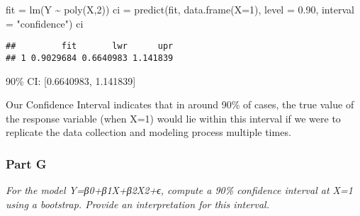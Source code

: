 \documentclass[
]{article}
\newenvironment{Shaded}{\begin{snugshade}}{\end{snugshade}}
\newcommand{\AttributeTok}[1]{\textcolor[rgb]{0.77,0.63,0.00}{#1}}
\newcommand{\DecValTok}[1]{\textcolor[rgb]{0.00,0.00,0.81}{#1}}
\newcommand{\FloatTok}[1]{\textcolor[rgb]{0.00,0.00,0.81}{#1}}
\newcommand{\FunctionTok}[1]{\textcolor[rgb]{0.00,0.00,0.00}{#1}}
\newcommand{\NormalTok}[1]{#1}
\newcommand{\OtherTok}[1]{\textcolor[rgb]{0.56,0.35,0.01}{#1}}
\newcommand{\SpecialCharTok}[1]{\textcolor[rgb]{0.00,0.00,0.00}{#1}}
\newcommand{\StringTok}[1]{\textcolor[rgb]{0.31,0.60,0.02}{#1}}
\begin{document}
\begin{Shaded}
\begin{Highlighting}[]
\NormalTok{fit }\OtherTok{=} \FunctionTok{lm}\NormalTok{(Y }\SpecialCharTok{\textasciitilde{}} \FunctionTok{poly}\NormalTok{(X,}\DecValTok{2}\NormalTok{))}
\NormalTok{ci }\OtherTok{=} \FunctionTok{predict}\NormalTok{(fit, }\FunctionTok{data.frame}\NormalTok{(}\AttributeTok{X=}\DecValTok{1}\NormalTok{), }\AttributeTok{level =} \FloatTok{0.90}\NormalTok{, }\AttributeTok{interval =} \StringTok{"confidence"}\NormalTok{)}
\NormalTok{ci}
\end{Highlighting}
\end{Shaded}

\begin{verbatim}
##         fit       lwr      upr
## 1 0.9029684 0.6640983 1.141839
\end{verbatim}

90\% CI: {[}0.6640983, 1.141839{]}

Our Confidence Interval indicates that in around 90\% of cases, the true
value of the response variable (when X=1) would lie within this interval
if we were to replicate the data collection and modeling process
multiple times.

\hypertarget{part-g}{%
\subsubsection{Part G}\label{part-g}}

\emph{For the model Y=β0+β1X+β2X2+ϵ, compute a 90\% confidence interval
at X=1 using a bootstrap. Provide an interpretation for this interval.}
\end{document}
